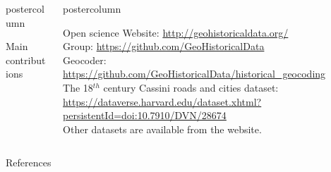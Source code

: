 \documentclass[final,hyperref={pdfpagelabels=false}]{beamer}
\begin{document}
\begin{frame}
\begin{columns}
\begin{column}{0.6\textwidth}
\begin{beamercolorbox}[center,wd=\textwidth]{postercolumn}
\begin{minipage}[t]{.98\textwidth}
\begin{block}{Main contributions}
\begin{itemize}
        \end{itemize}
      \end{block}
    \end{minipage}
    \end{beamercolorbox}
    \end{column}
    \begin{column}{0.4\textwidth}
    \begin{beamercolorbox}[center,wd=\textwidth]{postercolumn}
    \begin{minipage}[t]{.98\textwidth}
      \begin{block}{Open science}
        \tiny
        Website: \url{http://geohistoricaldata.org/}\\
        Group: \url{https://github.com/GeoHistoricalData}\\
        Geocoder: \url{https://github.com/GeoHistoricalData/historical_geocoding}\\
        The 18$^{th}$ century Cassini roads and cities dataset: \url{https://dataverse.harvard.edu/dataset.xhtml?persistentId=doi:10.7910/DVN/28674}\\
        Other datasets are available from the website.
      \end{block}
    \end{minipage}
    \end{beamercolorbox}
    \end{column}
  \end{columns}
  
  \begin{block}{References}
    \vspace*{-1em}
	\begin{multicols}{2}
		\tiny
		
		
	\end{multicols}
  \end{block}
\end{frame}
\end{document}
